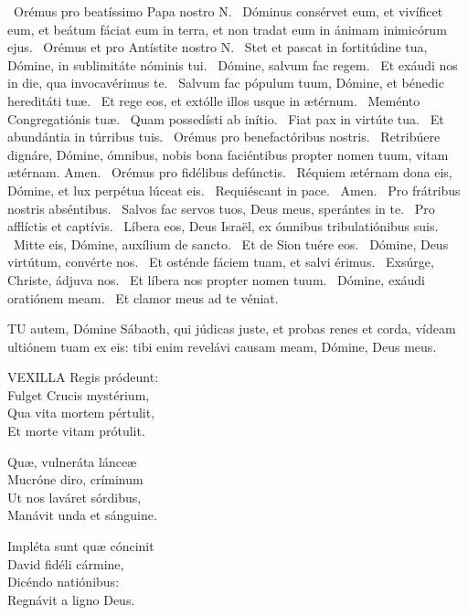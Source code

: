 \V\ Orémus pro beatíssimo Papa nostro N. \R\ Dóminus consérvet eum, et vivíficet eum, et beátum fáciat eum in terra, et non tradat eum in ánimam inimicórum ejus. \V\ Orémus et pro Antístite nostro N. \R\ Stet et pascat in fortitúdine tua, Dómine, in sublimitáte nóminis tui. \V\ Dómine, salvum fac regem. \R\ Et exáudi nos in die, qua invocavérimus te. \V\ Salvum fac pópulum tuum, Dómine, et bénedic hereditáti tuæ. \R\ Et rege eos, et extólle illos usque in ætérnum. \V\ Meménto Congregatiónis tuæ. \R\ Quam possedísti ab inítio. \V\ Fiat pax in virtúte tua. \R\ Et abundántia in túrribus tuis. \V\ Orémus pro benefactóribus nostris. \R\ Retribúere dignáre, Dómine, ómnibus, nobis bona faciéntibus propter nomen tuum, vitam ætérnam. Amen. \V\ Orémus pro fidélibus defúnctis. \R\ Réquiem ætérnam dona eis, Dómine, et lux perpétua lúceat eis. \V\ Requiéscant in pace. \R\ Amen. \V\ Pro frátribus nostris abséntibus. \R\ Salvos fac servos tuos, Deus meus, sperántes in te. \V\ Pro afflíctis et captívis. \R\ Líbera eos, Deus Israël, ex ómnibus tribulatiónibus suis. \V\ Mitte eis, Dómine, auxílium de sancto. \R\ Et de Sion tuére eos. \V\ Dómine, Deus virtútum, convérte nos. \R\ Et osténde fáciem tuam, et salvi érimus. \V\ Exsúrge, Christe, ádjuva nos. \R\ Et líbera nos propter nomen tuum. \V\ Dómine, exáudi oratiónem meam. \R\ Et clamor meus ad te véniat.




\lettrine[lines=2]{T}{U} autem, Dómine Sábaoth, qui júdicas juste, et probas renes et corda, vídeam ultiónem tuam ex eis: tibi enim revelávi causam meam, Dómine, Deus meus.


\lettrine[lines=2]{V}{EXILLA} Regis pródeunt:\\
Fulget Crucis mystérium,\\
Qua vita mortem pértulit,\\
Et morte vitam prótulit.

Quæ, vulneráta lánceæ\\
Mucróne diro, críminum\\
Ut nos laváret sórdibus,\\
Manávit unda et sánguine.

Impléta sunt quæ cóncinit\\
David fidéli cármine,\\
Dicéndo natiónibus:\\
Regnávit a ligno Deus.


